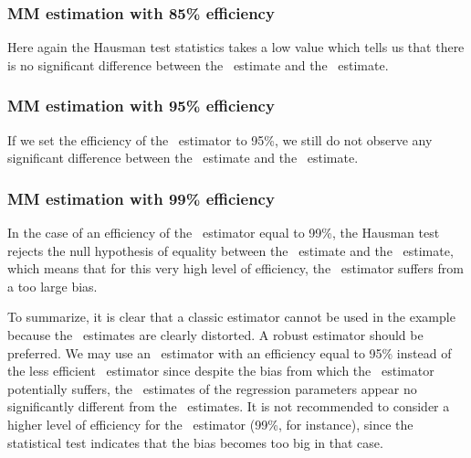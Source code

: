 \subsubsection{MM estimation with 85\% efficiency}

\begin{stlog}

\end{stlog}

Here again the Hausman test statistics takes a low value which tells us that
there is no significant difference between the ~estimate and the
~estimate.

\subsubsection{MM estimation with 95\% efficiency}

\begin{stlog}

\end{stlog}

If we set the efficiency of the ~estimator to 95\%, we still do not
observe any significant difference between the ~estimate and the
~estimate.

\subsubsection{MM estimation with 99\% efficiency}

\begin{stlog}

\end{stlog}

In the case of an efficiency of the ~estimator equal to 99\%, the
Hausman test rejects the null hypothesis of equality between the 
~estimate and the ~estimate, which means that for this very high level
of efficiency, the ~estimator suffers from a too large bias.

To summarize, it is clear that a classic estimator cannot be used in the
example because the ~estimates are clearly distorted. A robust
estimator should be preferred. We may use an ~estimator with an
efficiency equal to 95\% instead of the less efficient ~estimator since
despite the bias from which the ~estimator potentially suffers, the
~estimates of the regression parameters appear no significantly
different from the ~estimates. It is not recommended to consider a
higher level of efficiency for the ~estimator (99\%, for instance),
since the statistical test indicates that the bias becomes too big in that case.

